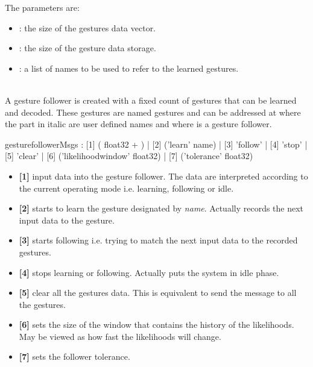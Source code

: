 \documentclass[a4paper,twoside]{report}
\begin{document}
The parameters are:
\begin{itemize}
\item {}: the size of the gestures data vector.
\item {}: the size of the gesture data storage.
\item {}: a list of names to be used to refer to the learned gestures.
\end{itemize}

\note{} \\
A gesture follower is created with a fixed count of gestures that can be learned and decoded. These gestures are named gestures and can be addressed at  where the part in italic are user defined names and where  is a gesture follower.


\begin{rail}
gesturefollowerMsgs :
		  [1] ( float32 + )
		| [2] ('learn' name)
		| [3] 'follow'
		| [4] 'stop'
		| [5] 'clear'
		| [6] ('likelihoodwindow' float32)
		| [7] ('tolerance' float32)
\end{rail}

\begin{itemize}
\item \textbf{[1]} input data into the gesture follower. The data are interpreted according to the current operating mode i.e. learning, following or idle.
\item \textbf{[2]} starts to learn the gesture designated by \emph{name}. Actually records the next input data to the gesture. 
\item \textbf{[3]} starts following i.e. trying to match the next input data to the recorded gestures.
\item \textbf{[4]} stops learning or following. Actually puts the system in idle phase.
\item \textbf{[5]} clear all the gestures data. This is equivalent to send the  message to all the gestures. 
\item \textbf{[6]} sets the size of the window that contains the history of the likelihoods. May be viewed as how fast the likelihoods	will change.
\item \textbf{[7]} sets the follower tolerance. 
\end{itemize}
\end{document}
